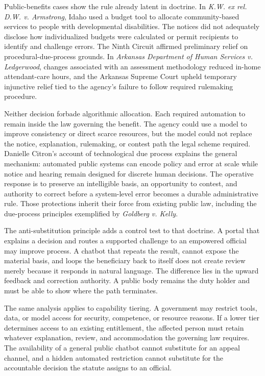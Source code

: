 Public-benefits cases show the rule already latent in doctrine. In \emph{K.W. ex rel. D.W. v. Armstrong}, Idaho used a budget tool to allocate community-based services to people with developmental disabilities. The notices did not adequately disclose how individualized budgets were calculated or permit recipients to identify and challenge errors. The Ninth Circuit affirmed preliminary relief on procedural-due-process grounds. In \emph{Arkansas Department of Human Services v. Ledgerwood}, changes associated with an assessment methodology reduced in-home attendant-care hours, and the Arkansas Supreme Court upheld temporary injunctive relief tied to the agency's failure to follow required rulemaking procedure.

Neither decision forbade algorithmic allocation. Each required automation to remain inside the law governing the benefit. The agency could use a model to improve consistency or direct scarce resources, but the model could not replace the notice, explanation, rulemaking, or contest path the legal scheme required. Danielle Citron's account of technological due process explains the general mechanism: automated public systems can encode policy and error at scale while notice and hearing remain designed for discrete human decisions. The operative response is to preserve an intelligible basis, an opportunity to contest, and authority to correct before a system-level error becomes a durable administrative rule. Those protections inherit their force from existing public law, including the due-process principles exemplified by \emph{Goldberg v. Kelly}.

The anti-substitution principle adds a control test to that doctrine. A portal that explains a decision and routes a supported challenge to an empowered official may improve process. A chatbot that repeats the result, cannot expose the material basis, and loops the beneficiary back to itself does not create review merely because it responds in natural language. The difference lies in the upward feedback and correction authority. A public body remains the duty holder and must be able to show where the path terminates.

The same analysis applies to capability tiering. A government may restrict tools, data, or model access for security, competence, or resource reasons. If a lower tier determines access to an existing entitlement, the affected person must retain whatever explanation, review, and accommodation the governing law requires. The availability of a general public chatbot cannot substitute for an appeal channel, and a hidden automated restriction cannot substitute for the accountable decision the statute assigns to an official.

